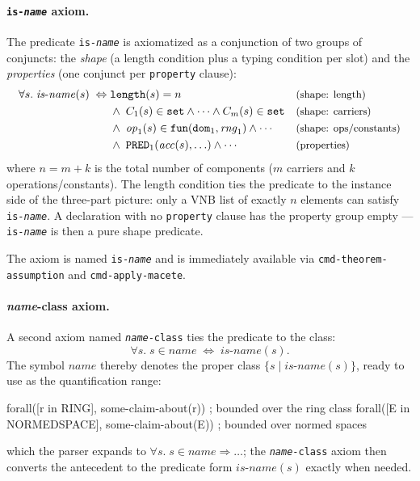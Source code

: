 \paragraph{\texttt{is-\textit{name}} axiom.}
The predicate \texttt{is-\textit{name}} is axiomatized as a conjunction
of two groups of conjuncts: the \emph{shape} (a length condition plus a
typing condition per slot) and the \emph{properties} (one conjunct per
\texttt{property} clause):
\begin{align*}
  \forall s.\;\mathit{is\text{-}name}(s) \;\Leftrightarrow\; &
  \mathtt{length}(s) = n
  && \text{\small(shape: length)}\\
  &\land\; C_1(s) \in \mathtt{set} \land \cdots \land C_m(s) \in \mathtt{set}
  && \text{\small(shape: carriers)}\\
  &\land\; \mathit{op}_1(s) \in \mathtt{fun}(\mathtt{dom}_1, \mathit{rng}_1)
  \land \cdots
  && \text{\small(shape: ops/constants)}\\
  &\land\; \mathtt{PRED}_1(\mathit{acc}(s), \ldots) \land \cdots
  && \text{\small(properties)}
\end{align*}
where $n = m + k$ is the total number of components ($m$ carriers and $k$
operations/constants).  The length condition ties the predicate to the
instance side of the three-part picture: only a VNB list of exactly $n$
elements can satisfy \texttt{is-\textit{name}}.  A declaration with no
\texttt{property} clause has the property group empty --- \texttt{is-\textit{name}}
is then a pure shape predicate.

\begin{sloppypar}The axiom is named \texttt{is-\textit{name}} and is immediately available
via \texttt{cmd-theorem-assumption} and \texttt{cmd-apply-macete}.\end{sloppypar}

\paragraph{\textit{name}-class axiom.}
A second axiom named \texttt{\textit{name}-class} ties the predicate to
the class:
\[
  \forall s.\; s \in \mathit{name} \;\Leftrightarrow\; \mathit{is\text{-}name}(s).
\]
The symbol $\mathit{name}$ thereby denotes the proper class
$\{s \mid \mathit{is\text{-}name}(s)\}$, ready to use as the
quantification range:
\begin{VNBsnip}
forall([r in RING],        some-claim-about(r))   ; bounded over the ring class
forall([E in NORMEDSPACE], some-claim-about(E))   ; bounded over normed spaces
\end{VNBsnip}
which the parser expands to
$\forall s.\; s \in \mathit{name} \Rightarrow \ldots$; the
\texttt{\textit{name}-class} axiom then converts the antecedent to
the predicate form $\mathit{is\text{-}name}(s)$ exactly when needed.

